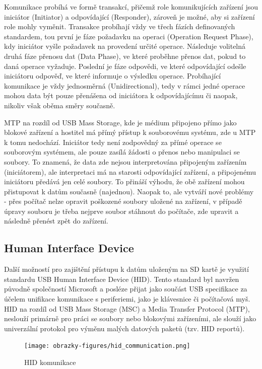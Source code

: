Komunikace probíhá ve formě transakcí, přičemž role komunikujících zařízení jsou iniciátor (Initiator) a odpovídající (Responder), zároveň je možné, aby si zařízení role mohly vyměnit. Transakce probíhají vždy ve třech fázích definovaných standardem, tou první je fáze požadavku na operaci (Operation Request Phase), kdy iniciátor vyšle požadavek na provedení určité operace. Následuje volitelná druhá fáze přenosu dat (Data Phase), ve které proběhne přenos dat, pokud to daná operace vyžaduje. Poslední je fáze odpovědi, ve které odpovídající odešle iniciátoru odpověď, ve které informuje o výsledku operace. Probíhající komunikace je vždy jednosměrná (Unidirectional), tedy v rámci jedné operace mohou data být pouze přenášena od iniciátora k odpovídajícímu či naopak, nikoliv však oběma směry současně. 


MTP na rozdíl od USB Mass Storage, kde je médium připojeno přímo jako blokové zařízení a hostitel má přímý přístup k souborovému systému, zde u MTP k tomu nedochází. Iniciátor tedy není zodpovědný za přímé operace se souborovým systémem, ale pouze zasílá žádosti o přenos nebo manipulaci se soubory. To znamená, že data zde nejsou interpretována připojeným zařízením (iniciátorem), ale interpretaci má na starosti odpovídající zařízení, a připojenému iniciátoru předává jen celé soubory. To přináší výhodu, že obě zařízení mohou přistupovat k datům současně (najednou). Naopak to, ale vytváří nové problémy - přes počítač nelze opravit poškozené soubory uložené na zařízení, v případě úpravy souboru je třeba nejprve soubor stáhnout do počítače, zde upravit a následně přenést zpět do zařízení.

\subsection{Human Interface Device}
Další možností pro zajištění přístupu k datům uloženým na SD kartě je využití standardu USB Human Interface Device (HID). Tento standard byl navržen původně společností Microsoft a posléze přijat jako součást USB specifikace za účelem unifikace komunikace s periferiemi, jako je klávesnice či počítačová myš. HID na rozdíl od USB Mass Storage (MSC) a Media Transfer Protocol (MTP), neslouží primárně pro práci se soubory nebo blokovými zařízeními, ale slouží jako univerzální protokol pro výměnu malých datových paketů (tzv. HID reportů). \cite{usb_standard_hid, silicon_labs_human_interface_device}

\begin{figure}[h]
    \centering
    \texttt{[image: obrazky-figures/hid\_communication.png]}
    
    \caption{HID komunikace \cite{usb_standard_hid}}
    \label{fig:hid-communication}
\end{figure}


